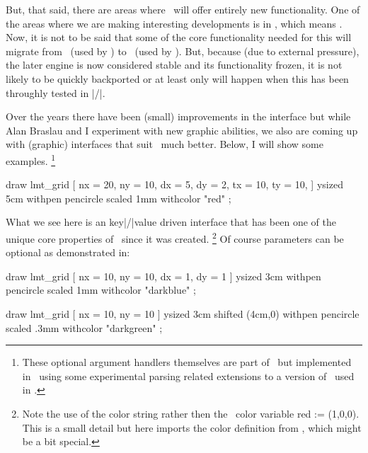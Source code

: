 But, that said, there are areas where \LMTX\ will offer entirely new
functionality. One of the areas where we are making interesting developments is
in \METAFUN, which means \METAPOST. Now, it is not to be said that some of the
core functionality needed for this will migrate from \LUAMETATEX\ (used by \LMTX)
to \LUATEX\ (used by \MKIV). But, because (due to external pressure), the later
engine is now considered stable and its functionality frozen, it is not likely to
be quickly backported or at least only will happen when this has been throughly
tested in \CONTEXT|/|\LMTX.

Over the years there have been (small) improvements in the interface but while
Alan Braslau and I experiment with new graphic abilities, we also are coming up
with (graphic) interfaces that suit \CONTEXT\ much better. Below, I will show
some examples. \footnote {These optional argument handlers themselves are
 part of \METAPOST\ but implemented in \CONTEXT\ using some
experimental parsing related extensions to a version of \MPLIB\ used in
\LUAMETATEX.}

\startbuffer
{}
    draw lmt_grid [
        nx =  20, ny =  10,
        dx =   5, dy =   2,
        tx =  10, ty =  10,
    ] ysized 5cm withpen pencircle scaled 1mm withcolor "red" ;
\stopMPcode
\stopbuffer

\typebuffer[option=TEX]

\startlinecorrection
\getbuffer
\stoplinecorrection

What we see here is an key|/|value driven interface that has been one of the
unique core properties of \CONTEXT\ since it was created. \footnote {Note the use
of the color string  rather then the \METAPOST\ color variable \type
{red := (1,0,0)}. This is a small detail but here imports the color definition
from \CONTEXT, which might be a bit special.} Of course parameters can be
optional as demonstrated in:

\startbuffer
{}
    draw lmt_grid [
        nx =  10, ny =  10,
        dx =   1, dy =   1
    ] ysized 3cm
        withpen pencircle scaled 1mm
        withcolor "darkblue"  ;

    draw lmt_grid [
        nx = 10, ny = 10
    ] ysized 3cm shifted (4cm,0)
       withpen pencircle scaled .3mm
       withcolor "darkgreen" ;
\stopMPcode
\stopbuffer

\typebuffer[option=TEX]

\startlinecorrection
\getbuffer
\stoplinecorrection

